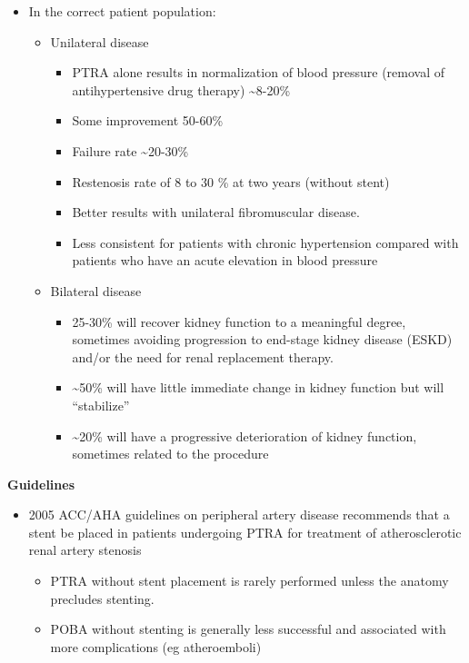 \documentclass[
]{book}
\begin{document}
\begin{itemize}
\item
  In the correct patient population:

  \begin{itemize}
  \item
    Unilateral disease

    \begin{itemize}
    \item
      PTRA alone results in normalization of blood pressure
      (removal of antihypertensive drug therapy) \textasciitilde8-20\%
    \item
      Some improvement 50-60\%
    \item
      Failure rate \textasciitilde20-30\%
    \item
      Restenosis rate of 8 to 30 \% at two years (without stent)
    \item
      Better results with unilateral fibromuscular disease.
    \item
      Less consistent for patients with chronic hypertension
      compared with patients who have an acute elevation in blood
      pressure
    \end{itemize}
  \item
    Bilateral disease

    \begin{itemize}
    \item
      25-30\% will recover kidney function to a meaningful degree,
      sometimes avoiding progression to end-stage kidney disease
      (ESKD) and/or the need for renal replacement therapy.
    \item
      \textasciitilde50\% will have little immediate change in kidney function
      but will ``stabilize''
    \item
      \textasciitilde20\% will have a progressive deterioration of kidney
      function, sometimes related to the procedure
    \end{itemize}
  \end{itemize}
\end{itemize}

\textbf{Guidelines}

\begin{itemize}
\item
  2005 ACC/AHA guidelines on peripheral artery disease recommends that
  a stent be placed in patients undergoing PTRA for treatment of
  atherosclerotic renal artery stenosis \citep{hirschACCAHA20052006}

  \begin{itemize}
  \item
    PTRA without stent placement is rarely performed unless the
    anatomy precludes stenting.
  \item
    POBA without stenting is generally less successful and
    associated with more complications (eg atheroemboli)
  \end{itemize}
\end{itemize}
\end{document}
